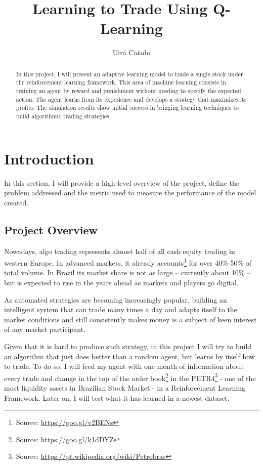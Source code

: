 \documentclass[a4paper]{article}
\title{Learning to Trade Using Q-Learning}
\author{Uirá Caiado}
\begin{document}
\maketitle

\begin{abstract}
In this project, I will present an adaptive learning model to trade a single stock under the reinforcement learning framework. This area of machine learning consists in training an agent by reward and punishment without needing to specify the expected action. The agent learns from its experience and develops a strategy that maximizes its profits. The simulation results show initial success in bringing learning techniques to build algorithmic trading strategies.
\end{abstract}


\section{Introduction}
\label{sec:introduction}

In this section, I will provide a high-level overview of the project, define the problem addressed and the metric used to measure the performance of the model created.

\subsection{Project Overview}
Nowadays, algo trading represents almost half of all cash equity trading in western Europe. In advanced markets, it already accounts\footnote{Source: \url{https://goo.gl/v2BENs}} for over 40\%-50\% of total volume. In Brazil its market share is not as large – currently about 10\% – but is expected to rise in the years ahead as markets and players go digital.

As automated strategies are becoming increasingly popular, building an intelligent system that can trade many times a day and adapts itself to the market conditions and still consistently makes money is a subject of keen interest of any market participant.

Given that it is hard to produce such strategy, in this project I will try to build an algorithm that just does better than a random agent, but learns by itself how to trade. To do so, I will feed my agent with one month of information about every trade and change in the top of the order book\footnote{Source: \url{https://goo.gl/k1dDYZ}} in the PETR4\footnote{Source: \url{https://pt.wikipedia.org/wiki/Petrobras}} - one of the most liquidity assets in Brazilian Stock Market - in a Reinforcement Learning Framework. Later on, I will test what it has learned in a newest dataset.
\end{document}
